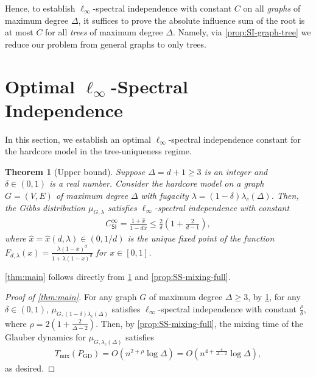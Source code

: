 \documentclass[11pt]{article}
\theoremstyle{plain}
\newtheorem{theorem}{Theorem}[section]
\theoremstyle{definition}
\theoremstyle{remark}
\newcommand{\SI}{\mathsf{SI}}
\begin{document}
Hence, to establish $\ell_\infty$-spectral independence with constant $C$ on all \emph{graphs} of maximum degree $\Delta$, it suffices to prove the absolute influence sum of the root is at most $C$ for all \emph{trees} of maximum degree $\Delta$. Namely, via \cref{prop:SI-graph-tree} we reduce our problem from general graphs to only trees.



\section{Optimal \texorpdfstring{$\ell_\infty$-Spectral Independence}{ℓ∞-Spectral Independence}}

In this section, we establish an optimal $\ell_\infty$-spectral independence constant for the hardcore model in the tree-uniqueness regime.

\begin{theorem}[Upper bound]
	\label{thm:SI-subcritical}
	Suppose $\Delta = d+1 \ge 3$ is an integer and $\delta\in(0,1)$ is a real number.
	Consider the hardcore model on a graph $G=(V,E)$ of maximum degree $\Delta$ with fugacity $\lambda = (1-\delta) \lambda_c(\Delta)$. 
	Then, the Gibbs distribution $\mu_{G,\lambda}$ satisfies $\ell_\infty$-spectral independence with constant 
	\begin{align*}
		C^\infty_\SI = \frac{1+\hat{x}}{1-d\hat{x}} 
		\le \frac{2}{\delta} \left(1+\frac{2}{d-1}\right),
	\end{align*}
	where $\hat x = \hat{x}(d,\lambda) \in (0,1/d)$ is the unique fixed point of the function $F_{d,\lambda}(x) = \frac{\lambda(1-x)^d}{1+\lambda(1-x)^d}$ for $x\in[0,1]$.
\end{theorem}

\cref{thm:main} follows directly from \cref{thm:SI-subcritical} and \cref{prop:SS-mixing-full}.

\begin{proof}[Proof of \cref{thm:main}]
    For any graph $G$ of maximum degree $\Delta\geq3$, by \cref{thm:SI-subcritical}, for any $\delta\in(0,1)$, $\mu_{G,(1-\delta)\lambda_c(\Delta)}$ satisfies $\ell_\infty$-spectral independence with constant $\frac{\rho}{\delta}$, where $\rho = 2 \left(1+\frac{2}{\Delta-2}\right)$.
    Then, by \cref{prop:SS-mixing-full}, the mixing time of the Glauber dynamics for $\mu_{G,\lambda_c(\Delta)}$ satisfies
	\begin{align*}
		T_{\mathrm{mix}}(P_{\mathrm{GD}}) 
        =  O\left( n^{2+\rho} \log \Delta\right)
        =  O\left( n^{4+\frac{4}{\Delta-2}} \log \Delta\right),
	\end{align*}
    as desired.
\end{proof}
\end{document}
